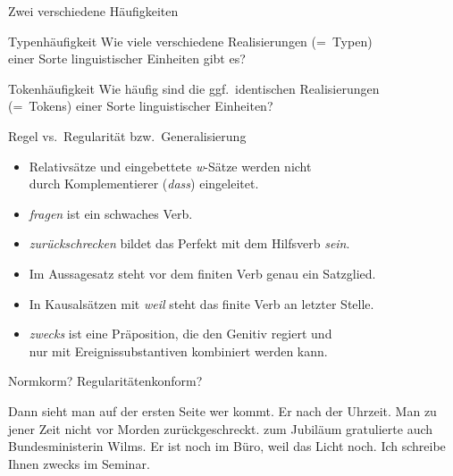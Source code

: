 \begin{frame}
  {Zwei verschiedene Häufigkeiten}
  \onslide<+->
  \onslide<+->
  \Large\begin{block}{Typenhäufigkeit}
    Wie viele \alert{verschiedene} Realisierungen (=~Typen)\\
    einer Sorte linguistischer Einheiten gibt es?
  \end{block}

  \onslide<+->
  \Zeile
  
  \begin{block}{Tokenhäufigkeit}
    Wie häufig sind die \alert{ggf.\ identischen} Realisierungen\\
    (=~Tokens) einer Sorte linguistischer Einheiten?
  \end{block}
\end{frame}

\begin{frame}
  {Regel vs.\ Regularität bzw.\ Generalisierung}
  \onslide<+->
  \begin{itemize}[<+->]
    \item Relativsätze und eingebettete \textit{w}-Sätze werden nicht\\
      durch Komplementierer (\textit{dass}) eingeleitet.
      \Viertelzeile
    \item \textit{fragen} ist ein schwaches Verb.
      \Viertelzeile
    \item \textit{zurückschrecken} bildet das Perfekt mit dem Hilfsverb \textit{sein}.
      \Viertelzeile
    \item Im Aussagesatz steht vor dem finiten Verb genau ein Satzglied.
      \Viertelzeile
    \item In Kausalsätzen mit \textit{weil} steht das finite Verb an letzter Stelle.
      \Viertelzeile
    \item \textit{zwecks} ist eine Präposition, die den Genitiv regiert und\\
      nur mit Ereignissubstantiven kombiniert werden kann.
  \end{itemize}
\end{frame}


\begin{frame}
  {Normkorm? Regularitätenkonform?}
  \onslide<+->
  \onslide<+->
  \begin{exe}
    \ex
    \begin{xlist}
      \ex Dann sieht man auf der ersten Seite \alert{wer}  kommt.
      \onslide<+->
      \Halbzeile
      \ex Er  nach der Uhrzeit.
      \onslide<+->
      \Halbzeile
      \ex Man  zu jener Zeit nicht vor Morden \alert{zurückgeschreckt}.
      \onslide<+->
      \Halbzeile
      \ex {} \alert{zum Jubiläum} gratulierte auch Bundesministerin Wilms.
      \onslide<+->
      \Halbzeile
      \ex Er ist noch im Büro, \alert{weil} das Licht  noch.
      \onslide<+->
      \Halbzeile
      \ex Ich schreibe Ihnen \alert{zwecks}  im Seminar.
    \end{xlist}
  \end{exe}
\end{frame}



